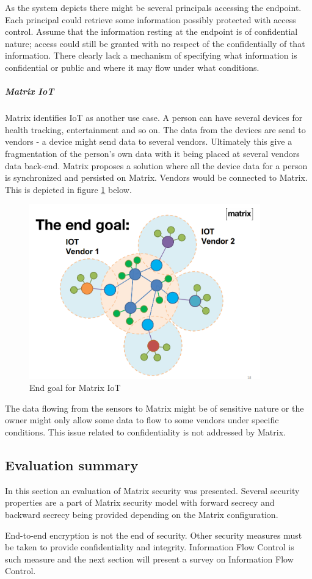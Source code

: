 As the system depicts there might be several principals accessing the endpoint. Each principal could retrieve some information possibly protected with access control. Assume that the information resting at the endpoint is of confidential nature; access could still be granted with no respect of the confidentially of that information. There clearly lack a mechanism of specifying what information is confidential or public and where it may flow under what conditions.  

\subparagraph{Matrix IoT}
Matrix identifies IoT as another use case. A person can have several devices for health tracking, entertainment and so on. The data from the devices are send to vendors - a device might send data to several vendors. Ultimately this give a fragmentation of the person's own data with it being placed at several vendors data back-end. Matrix proposes a solution where all the device data for a person is synchronized and persisted on Matrix. Vendors would be connected to Matrix. This is depicted in figure \ref{fig:matrix_iot} below. 

\begin{figure}[H]
	\centering
	\includegraphics[width=10cm]{figures/matrix_iot.png}
	\caption{End goal for Matrix IoT}
	\label{fig:matrix_iot}
\end{figure}

The data flowing from the sensors to Matrix might be of sensitive nature or the owner might only allow some data to flow to some vendors under specific conditions. This issue related to confidentiality is not addressed by Matrix. 

\subsection{Evaluation summary}

In this section an evaluation of Matrix security was presented. Several security properties are a part of Matrix security model with forward secrecy and backward secrecy being provided depending on the Matrix configuration.

End-to-end encryption is not the end of security. Other security measures must be taken to provide confidentiality and integrity. Information Flow Control is such measure and the next section will present a survey on Information Flow Control.


